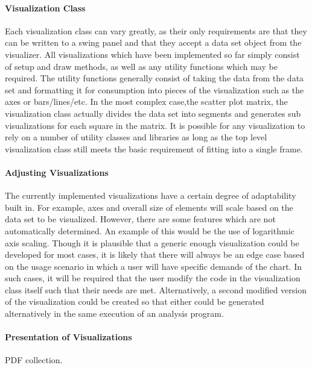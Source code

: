 \paragraph{Visualization Class}
Each visualization class can vary greatly, as their only requirements are that they can be written to a swing panel and that they accept a data set object from the visualizer. All visualizations which have been implemented so far simply consist of setup and draw methods, as well as any utility functions which may be required. The utility functions generally consist of taking the data from the data set and formatting it for consumption into pieces of the visualization such as the axes or bars/lines/etc. In the most complex case,the scatter plot matrix, the visualization class actually divides the data set into segments and generates sub visualizations for each square in the matrix. It is possible for any visualization to rely on a number of utility classes and libraries as long as the top level visualization class still meets the basic requirement of fitting into a single frame. 

\paragraph{Adjusting Visualizations}
The currently implemented visualizations have a certain degree of adaptability built in. For example, axes and overall size of elements will scale based on the data set to be visualized. However, there are some features which are not automatically determined. An example of this would be the use of logarithmic axis scaling. Though it is plausible that a generic enough visualization could be developed for most cases, it is likely that there will always be an edge case based on the usage scenario in which a user will have specific demands of the chart. In such cases, it will be required that the user modify the code in the visualization class itself such that their needs are met. Alternatively, a second modified version of the visualization could be created so that either could be generated alternatively in the same execution of an analysis program. 

\paragraph{Presentation of Visualizations}
PDF collection.
